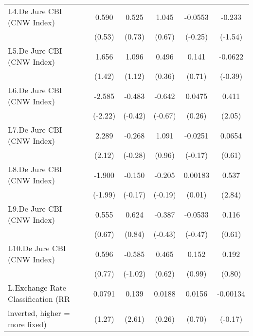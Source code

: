 {\begin{tabular}{l*{5}{c}}
\addlinespace
L4.De Jure CBI (CNW Index)              &0.590         &0.525         &1.045         &-0.0553         &-0.233         \\
                                        &(0.53)         &(0.73)         &(0.67)         &(-0.25)         &(-1.54)         \\
\addlinespace
L5.De Jure CBI (CNW Index)              &1.656         &1.096         &0.496         &0.141         &-0.0622         \\
                                        &(1.42)         &(1.12)         &(0.36)         &(0.71)         &(-0.39)         \\
\addlinespace
L6.De Jure CBI (CNW Index)              &-2.585\sym{*}  &-0.483         &-0.642         &0.0475         &0.411\sym{*}  \\
                                        &(-2.22)         &(-0.42)         &(-0.67)         &(0.26)         &(2.05)         \\
\addlinespace
L7.De Jure CBI (CNW Index)              &2.289\sym{*}  &-0.268         &1.091         &-0.0251         &0.0654         \\
                                        &(2.12)         &(-0.28)         &(0.96)         &(-0.17)         &(0.61)         \\
\addlinespace
L8.De Jure CBI (CNW Index)              &-1.900\sym{*}  &-0.150         &-0.205         &0.00183         &0.537\sym{**} \\
                                        &(-1.99)         &(-0.17)         &(-0.19)         &(0.01)         &(2.84)         \\
\addlinespace
L9.De Jure CBI (CNW Index)              &0.555         &0.624         &-0.387         &-0.0533         &0.116         \\
                                        &(0.67)         &(0.84)         &(-0.43)         &(-0.47)         &(0.61)         \\
\addlinespace
L10.De Jure CBI (CNW Index)             &0.596         &-0.585         &0.465         &0.152         &0.192         \\
                                        &(0.77)         &(-1.02)         &(0.62)         &(0.99)         &(0.80)         \\
\addlinespace
L.Exchange Rate Classification (RR      &0.0791         &0.139\sym{*}  &0.0188         &0.0156         &-0.00134         \\
inverted, higher = more fixed)          &(1.27)         &(2.61)         &(0.26)         &(0.70)         &(-0.17)         \\

\end{tabular}}
